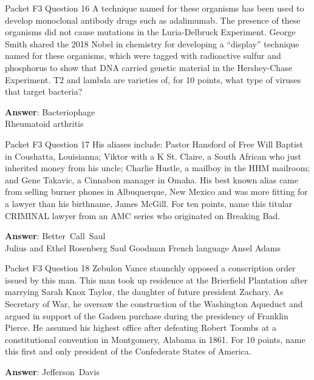 \begin{frame}{Packet F3 Question 16}
A technique named for these organisms has been used to develop monoclonal antibody drugs such as adalimumab. The presence   of these organisms did not cause mutations in the Luria-Delbruck Experiment. George   Smith shared the 2018 Nobel in chemistry for developing a “display” technique named for these organisms, which were tagged with radioactive sulfur and phosphorus   to show that DNA   carried genetic material in the Hershey-Chase Experiment.   T2 and lambda are varieties of, for 10 points, what type of viruses that target bacteria?

\textbf{Answer}: Bacteriophage\\
 Rheumatoid arthritis
\end{frame}

\begin{frame}{Packet F3 Question 17}
His aliases include: Pastor   Hansford of Free Will Baptist in Coushatta, Louisianna; Viktor with a K St. Claire, a South African who just inherited money from his uncle; Charlie Hustle, a mailboy in the HHM mailroom; and Gene Takavic, a Cinnabon manager in Omaha. His best known alias came from selling burner phones in Albuquerque, New Mexico and was more fitting for a lawyer than his birthname, James McGill. For ten points, name this titular CRIMINAL lawyer from an AMC series who originated on Breaking Bad.      

\textbf{Answer}: Better\ Call\ Saul\\
 Julius and Ethel Rosenberg
 Saul Goodman
 French language
 Ansel Adams
\end{frame}

\begin{frame}{Packet F3 Question 18}
Zebulon Vance staunchly opposed a conscription order issued by this man. This man took up residence at the Brierfield Plantation after marrying Sarah Knox Taylor, the daughter of future   president Zachary. As Secretary of War, he oversaw the construction of the Washington Aqueduct and argued in support of the Gadsen purchase during the presidency of Franklin Pierce. He assumed his   highest office after defeating Robert Toombs at a constitutional   convention in Montgomery, Alabama in 1861. For 10 points,   name this first and only president of the Confederate States of America.

\textbf{Answer}: Jefferson\ Davis\\
\end{frame}

